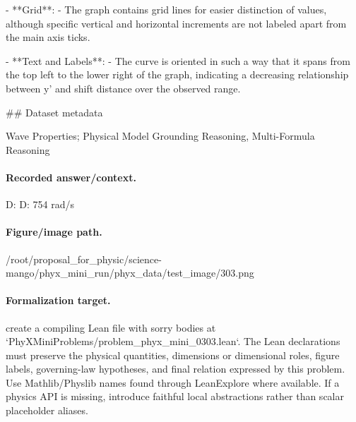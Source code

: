 - **Grid**:
  - The graph contains grid lines for easier distinction of values, although specific vertical and horizontal increments are not labeled apart from the main axis ticks.

- **Text and Labels**:
  - The curve is oriented in such a way that it spans from the top left to the lower right of the graph, indicating a decreasing relationship between y' and shift distance over the observed range.

\#\# Dataset metadata

Wave Properties; Physical Model Grounding Reasoning, Multi-Formula Reasoning

\paragraph{Recorded answer/context.}
D: D: 754 rad/s

\paragraph{Figure/image path.}
/root/proposal\_for\_physic/science-mango/phyx\_mini\_run/phyx\_data/test\_image/303.png

\paragraph{Formalization target.}
create a compiling Lean file with sorry bodies at `PhyXMiniProblems/problem\_phyx\_mini\_0303.lean`. The Lean declarations must preserve the physical quantities, dimensions or dimensional roles, figure labels, governing-law hypotheses, and final relation expressed by this problem.
Use Mathlib/Physlib names found through LeanExplore where available. If a physics API is missing, introduce faithful local abstractions rather than scalar placeholder aliases.

